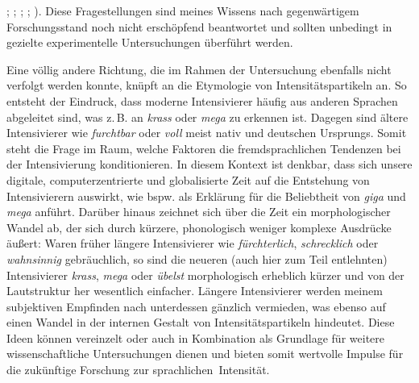 \citealt[]{Setayesh.2018}; \citealt[]{Stratton.2020b}; \citealt[]{Stratton.2020a}; \citealt[]{Stratton.2022}; \citealt[]{Stratton.2022b}). Diese Fragestellungen sind meines Wissens nach gegenwärtigem Forschungsstand noch nicht erschöpfend beantwortet und sollten unbedingt in gezielte experimentelle Untersuchungen überführt werden. \par 
Eine völlig andere Richtung, die im Rahmen der Untersuchung ebenfalls nicht verfolgt werden konnte, knüpft an die Etymologie von Intensitätspartikeln an. So entsteht der Eindruck, dass moderne Intensivierer häufig aus anderen Sprachen abgeleitet sind, was z.\,B. an \textit{krass} oder \textit{mega} zu erkennen ist. Dagegen sind ältere Intensivierer wie \textit{furchtbar} oder \textit{voll} meist nativ und deutschen Ursprungs. Somit steht die Frage im Raum, welche Faktoren die fremdsprachlichen Tendenzen bei der Intensivierung konditionieren. In diesem Kontext ist denkbar, dass sich unsere digitale, computerzentrierte und globalisierte Zeit auf die Entstehung von Intensivierern auswirkt, wie bspw. \mbox{\citet[354]{Claudi.2006}} als Erklärung für die Beliebtheit von \textit{giga} und \textit{mega} anführt. Darüber hinaus zeichnet sich über die Zeit ein morphologischer Wandel ab, der sich durch kürzere, phonologisch weniger komplexe Ausdrücke äußert: Waren früher längere Intensivierer wie \textit{fürchterlich}, \textit{schrecklich} oder \textit{wahnsinnig} gebräuchlich, so sind die neueren (auch hier zum Teil entlehnten) Intensivierer \textit{krass}, \textit{mega} oder \textit{übelst} morphologisch erheblich kürzer und von der Lautstruktur her wesentlich einfacher. Längere Intensivierer werden meinem subjektiven Empfinden nach unterdessen gänzlich vermieden, was ebenso auf einen Wandel in der internen Gestalt von Intensitätspartikeln hindeutet. Diese Ideen können vereinzelt oder auch in Kombination als Grundlage für weitere wissenschaftliche Untersuchungen dienen und bieten somit wertvolle Impulse für die zukünftige Forschung zur \mbox{sprachlichen Intensität}.













